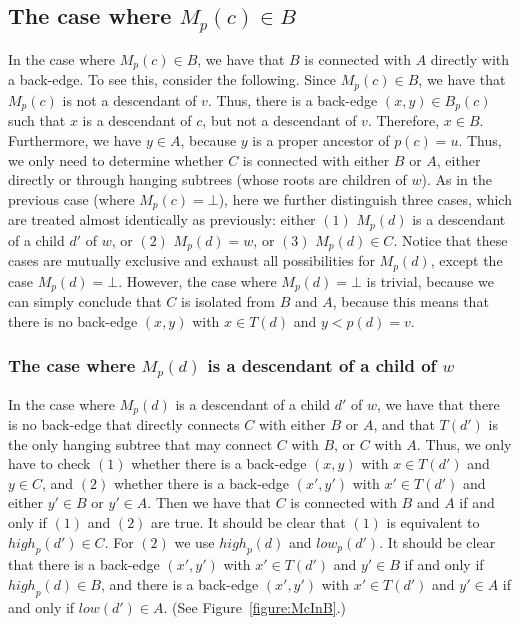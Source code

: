 \documentclass[11pt,a4paper]{article}
\begin{document}
\subsection{The case where $M_p(c)\in B$}
\label{section:M(c)inB}
In the case where $M_p(c)\in B$, we have that $B$ is connected with $A$ directly with a back-edge. To see this, consider the following. Since $M_p(c)\in B$, we have that $M_p(c)$ is not a descendant of $v$. Thus, there is a back-edge $(x,y)\in B_p(c)$ such that $x$ is a descendant of $c$, but not a descendant of $v$. Therefore, $x\in B$. Furthermore, we have $y\in A$, because $y$ is a proper ancestor of $p(c)=u$. Thus, we only need to determine whether $C$ is connected with either $B$ or $A$, either directly or through hanging subtrees (whose roots are children of $w$). As in the previous case (where $M_p(c)=\bot$), here we further distinguish three cases, which are treated almost identically as previously: either $(1)$ $M_p(d)$ is a descendant of a child $d'$ of $w$, or $(2)$ $M_p(d)=w$, or $(3)$ $M_p(d)\in C$. Notice that these cases are mutually exclusive and exhaust all possibilities for $M_p(d)$, except the case $M_p(d)=\bot$. However, the case where $M_p(d)=\bot$ is trivial, because we can simply conclude that $C$ is isolated from $B$ and $A$, because this means that there is no back-edge $(x,y)$ with $x\in T(d)$ and $y<p(d)=v$.

\subsubsection{The case where $M_p(d)$ is a descendant of a child of $w$}
In the case where $M_p(d)$ is a descendant of a child $d'$ of $w$, we have that there is no back-edge that directly connects $C$ with either $B$ or $A$, and that $T(d')$ is the only hanging subtree that may connect $C$ with $B$, or $C$ with $A$. Thus, we only have to check $(1)$ whether there is a back-edge $(x,y)$ with $x\in T(d')$ and $y\in C$, and $(2)$ whether there is a back-edge $(x',y')$ with $x'\in T(d')$ and either $y'\in B$ or $y'\in A$. Then we have that $C$ is connected with $B$ and $A$ if and only if $(1)$ and $(2)$ are true. It should be clear that $(1)$ is equivalent to $\mathit{high}_p(d')\in C$. For $(2)$ we use $\mathit{high}_p(d)$ and $\mathit{low}_p(d')$. It should be clear that there is a back-edge $(x',y')$ with $x'\in T(d')$ and $y'\in B$ if and only if $\mathit{high}_p(d)\in B$, and there is a back-edge $(x',y')$ with $x'\in T(d')$ and $y'\in A$ if and only if $\mathit{low}(d')\in A$. (See Figure~\ref{figure:McInB}.)
\end{document}
